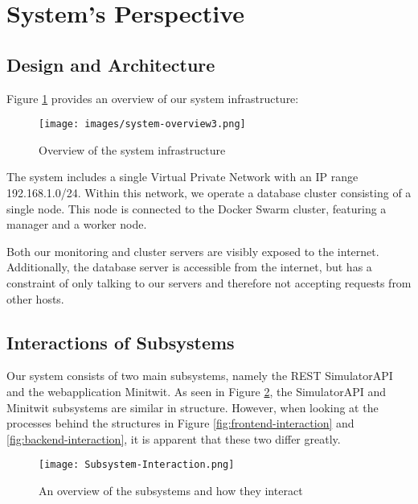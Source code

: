 \section{System's Perspective}

\subsection{Design and Architecture}
Figure \ref{fig:systemoverview} provides an overview of our system infrastructure:
\begin{figure}[H]
    \centering
    \texttt{[image: images/system-overview3.png]}
    \caption{Overview of the system infrastructure}
    \label{fig:systemoverview}

\end{figure}
The system includes a single Virtual Private Network with an IP range 192.168.1.0/24. Within this network, we operate a database cluster consisting of a single node. This node is connected to the Docker Swarm cluster, featuring a manager and a worker node.

Both our monitoring and cluster servers are visibly exposed to the internet. Additionally, the database server is accessible from the internet, but has a constraint of only talking to our servers and therefore not accepting requests from other hosts.

\subsection{Interactions of Subsystems}
Our system consists of two main subsystems, namely the REST SimulatorAPI and the webapplication Minitwit. As seen in Figure \ref{fig:subsystem-interaction}, the SimulatorAPI and Minitwit subsystems are similar in structure. However, when looking at the processes behind the structures in Figure \ref{fig:frontend-interaction} and \ref{fig:backend-interaction}, it is apparent that these two differ greatly.

\begin{figure}[H]
    \begin{center}
        \texttt{[image: Subsystem-Interaction.png]}
    \end{center}
    \caption{An overview of the subsystems and how they interact}
    \label{fig:subsystem-interaction}
\end{figure}


